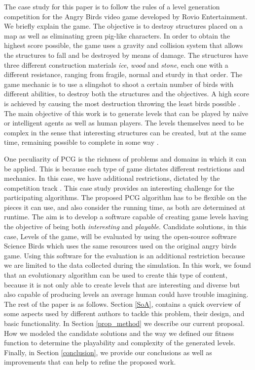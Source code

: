 \documentclass[conference]{IEEEtran}
\begin{document}
The case study for this paper is to follow the rules of a level generation
competition for the Angry Birds video game developed by Rovio Entertainment.
We briefly explain the game.  The objective is to destroy structures placed
on a map as well as eliminating green pig-like characters. In order to
obtain the highest score possible, the game uses a gravity and collision
system that allows the structures to fall and be destroyed by means of
damage. The structures have  three different construction materials
\textit{ice}, \textit{wood} and \textit{stone}, each one with a different
resistance, ranging from fragile, normal and sturdy in that order. The game
mechanic is to use a slingshot to shoot a certain number of birds with
different abilities, to destroy both the structures and the objectives. A
high score is achieved by causing the most destruction throwing the least
birds possible \cite{RovioEntertainmentCorporation2009}. The main objective
of this work is to generate levels that can be played by naïve or
intelligent agents as well as human players. The levels themselves need to
be complex in the sense that interesting structures can be created, but at
the same time, remaining possible to complete in some way \cite{Stephenson,
Stephenson2018}.

One peculiarity of PCG is the richness of problems and domains in which it can
be applied.  This is because each type of game dictates different restrictions
and mechanics. In this case, we have additional restrictions, dictated by the
competition track \cite{Renz}. This case study provides an interesting challenge
for the participating algorithms. The proposed PCG algorithm has to be flexible
on the pieces it can use, and also consider the running time, as both are
determined at runtime. The aim is to develop a software capable of creating game
levels having the objective of being both \textit{interesting} and
\textit{playable}. Candidate solutions, in this case, Levels of the game, will
be evaluated by using the open-source software Science Birds \cite{sciencebirds}
which uses the same resources used on the original angry birds game. Using this
software for the evaluation is an additional restriction because we are limited
to the data collected during the simulation.  
In this work, we found that an evolutionary algorithm can be used to create this
type of content, because it is not only able to create levels that are
interesting and diverse but also capable of producing levels an average human
could have trouble imagining. The rest of the paper is as follows. Section
\ref{SoA}, contains a quick overview of some aspects used by different authors
to tackle this problem, their design, and basic functionality. In Section
\ref{prop_method} we describe our current proposal.  How we modeled the
candidate solutions and the way we defined our fitness function to determine the
playability and complexity of the generated levels. Finally, in Section
\ref{conclusion}, we provide our conclusions as well as improvements that can
help to refine the proposed work. 
\end{document}
